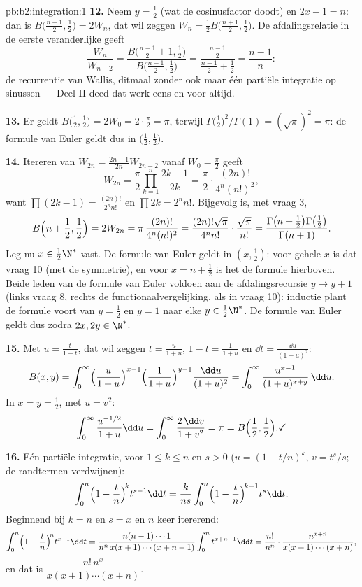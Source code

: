 \begin{solution}{pb:b2:integration:1}
\textbf{12.} Neem $y = \frac12$ (wat de cosinusfactor doodt) en $2x
- 1 = n$: dan is $B\bigl(\frac{n+1}2, \frac12\bigr) = 2W_n$, dat
wil zeggen $W_n = \frac12 B\bigl(\frac{n+1}2,\frac12\bigr)$. De
afdalingsrelatie in de eerste veranderlijke geeft
\[
\frac{W_n}{W_{n-2}}
= \frac{B\bigl(\frac{n-1}2 + 1, \frac12\bigr)}
{B\bigl(\frac{n-1}2, \frac12\bigr)}
= \frac{\frac{n-1}2}{\frac{n-1}2 + \frac12}
= \frac{n-1}{n} :
\]
de recurrentie van Wallis, ditmaal zonder ook maar één partiële
integratie op sinussen --- Deel II deed dat werk eens en voor
altijd.

\textbf{13.} Er geldt $B\bigl(\frac12,\frac12\bigr) = 2W_0 =
2\cdot\frac\pi2 = \pi$, terwijl
$\Gamma\bigl(\frac12\bigr)^2/\Gamma(1) = (\sqrt\pi)^2 = \pi$: de
formule van Euler geldt dus in $\bigl(\frac12,\frac12\bigr)$.

\textbf{14.} Itereren van $W_{2n} = \frac{2n-1}{2n}W_{2n-2}$
vanaf $W_0 = \frac\pi2$ geeft
\[
W_{2n} = \frac\pi2\prod_{k=1}^{n}\frac{2k-1}{2k}
= \frac\pi2\cdot\frac{(2n)!}{4^n(n!)^2},
\]
want $\prod(2k-1) = \frac{(2n)!}{2^n n!}$ en $\prod 2k = 2^n n!$.
Bijgevolg is, met vraag 3,
\[
B\Bigl(n+\frac12, \frac12\Bigr) = 2W_{2n}
= \pi\,\frac{(2n)!}{4^n(n!)^2}
= \frac{(2n)!\sqrt\pi}{4^n n!}\cdot\frac{\sqrt\pi}{n!}
= \frac{\Gamma\bigl(n+\frac12\bigr)\Gamma\bigl(\frac12\bigr)}
{\Gamma(n+1)} .
\]
Leg nu $x \in \frac12\N^*$ vast. De formule van Euler geldt in $(x,
\frac12)$: voor gehele $x$ is dat vraag 10 (met de symmetrie), en
voor $x = n + \frac12$ is het de formule hierboven. Beide leden van
de formule van Euler voldoen aan de afdalingsrecursie $y \mapsto y
+ 1$ (links vraag 8, rechts de functionaalvergelijking, als in
vraag 10): inductie plant de formule voort van $y = \frac12$ en $y
= 1$ naar elke $y \in \frac12\N^*$. De formule van Euler geldt dus
zodra $2x, 2y \in \N^*$.

\textbf{15.} Met $u = \frac{t}{1-t}$, dat wil zeggen $t =
\frac{u}{1+u}$, $1 - t = \frac{1}{1+u}$ en $\dd t = \frac{\dd
u}{(1+u)^2}$:
\[
B(x,y) = \int_0^\infty
\Bigl(\frac{u}{1+u}\Bigr)^{x-1}
\Bigl(\frac{1}{1+u}\Bigr)^{y-1}
\frac{\dd u}{(1+u)^2}
= \int_0^\infty \frac{u^{x-1}}{(1+u)^{x+y}}\,\dd u .
\]
In $x = y = \frac12$, met $u = v^2$:
\[
\int_0^\infty \frac{u^{-1/2}}{1+u}\dd u
= \int_0^\infty \frac{2\,\dd v}{1+v^2} = \pi
= B\Bigl(\frac12,\frac12\Bigr) . \checkmark
\]

\textbf{16.} Eén partiële integratie, voor $1 \leq k \leq n$ en $s
> 0$ ($u = (1 - t/n)^k$, $v = t^s/s$; de randtermen verdwijnen):
\[
\int_0^n \Bigl(1-\frac tn\Bigr)^{\!k} t^{s-1}\dd t
= \frac{k}{ns}\int_0^n \Bigl(1-\frac tn\Bigr)^{\!k-1}
t^{s}\dd t .
\]
Beginnend bij $k = n$ en $s = x$ en $n$ keer itererend:
\[
\int_0^n \Bigl(1-\frac tn\Bigr)^{\!n} t^{x-1}\dd t
= \frac{n(n-1)\cdots1}{n^n\,x(x+1)\cdots(x+n-1)}
\int_0^n t^{x+n-1}\dd t
= \frac{n!}{n^n}\cdot
\frac{n^{x+n}}{x(x+1)\cdots(x+n)} ,
\]
en dat is $\dfrac{n!\,n^x}{x(x+1)\cdots(x+n)}$.


\end{solution}
